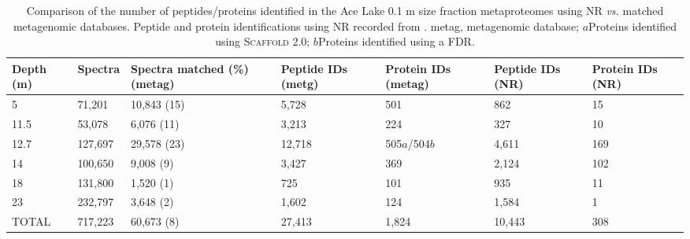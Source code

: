 \begin{table}
\footnotesize
\caption[Comparison of proteins identified with \acs{NR} \emph{vs}. metagenomes]{Comparison of the number of peptides/proteins identified in the Ace Lake 0.1 \textmu{}m size fraction metaproteomes using \acs{NR} \emph{vs.} matched metagenomic databases. 
Peptide and protein identifications using \acs{NR} recorded from \citet{Ng2010b}. 
metag, metagenomic database; $a$Proteins identified using \textsc{Scaffold} 2.0; $b$Proteins identified using a \acs{FDR}.}
\label{tab:protid_stats}
\smallskip
\begin{tabularx}{\textwidth}{XXXXXXX}
\toprule
\textbf{Depth (m)} & \textbf{Spectra} & \textbf{Spectra matched (\%) (metag)} &\textbf{Peptide IDs (metg)} & \textbf{Protein IDs (metag)} & \textbf{Peptide IDs (\acs{NR})} & \textbf{Protein IDs (\acs{NR})} \\
\midrule
5     & 71,201  & 10,843 (15) & 5,728  & 501     & 862    & 15 \\
11.5  & 53,078  & 6,076 (11)  & 3,213  & 224     & 327    & 10 \\
12.7  & 127,697 & 29,578 (23) & 12,718 & 505$a$/504$b$ & 4,611  & 169 \\
14    & 100,650 & 9,008 (9)   & 3,427  & 369     & 2,124  & 102 \\
18    & 131,800 & 1,520 (1)   & 725    & 101     & 935    & 11 \\
23    & 232,797 & 3,648 (2)   & 1,602  & 124     & 1,584  & 1 \\
TOTAL & 717,223 & 60,673 (8)  & 27,413 & 1,824   & 10,443 & 308 \\
\bottomrule
\end{tabularx}
\end{table}
